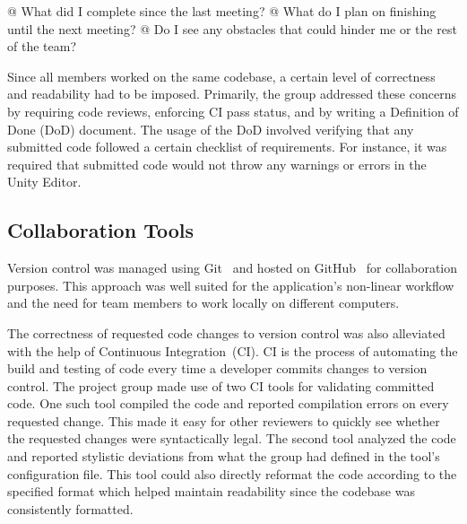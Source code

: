 \begin{easylist}
  @ What did I complete since the last meeting?
  @ What do I plan on finishing until the next meeting?
  @ Do I see any obstacles that could hinder me or the rest of the team?
\end{easylist}

Since all members worked on the same codebase, a certain level of correctness and readability had to be imposed.
Primarily, the group addressed these concerns by requiring code reviews, enforcing CI pass status, and by writing a Definition of Done (DoD) document.
The usage of the DoD involved verifying that any submitted code followed a certain checklist of requirements.
For instance, it was required that submitted code would not throw any warnings or errors in the Unity Editor. 


\subsection{Collaboration Tools}

Version control was managed using Git~\cite{git} and hosted on GitHub~\cite{github} for collaboration purposes.
This approach was well suited for the application's non-linear workflow and the need for team members to work locally on different computers.

The correctness of requested code changes to version control was also alleviated with the help of Continuous Integration~(CI).
CI is the process of automating the build and testing of code every time a developer commits changes to version control.
The project group made use of two CI tools for validating committed code.
One such tool compiled the code and reported compilation errors on every requested change.
This made it easy for other reviewers to quickly see whether the requested changes were syntactically legal.
The second tool analyzed the code and reported stylistic deviations from what the group had defined in the tool's configuration file.
This tool could also directly reformat the code according to the specified format which helped maintain readability since the codebase was consistently formatted.

